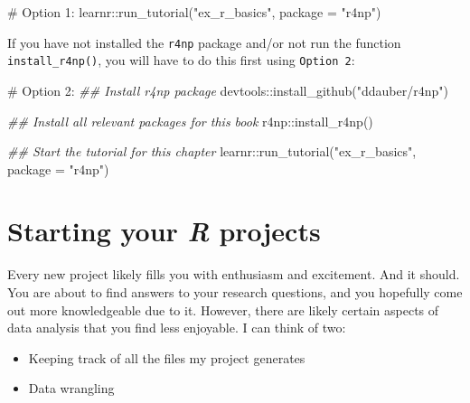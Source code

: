 \documentclass[
  letterpaper,
]{krantz}
\makeatletter
\newenvironment{Shaded}{\begin{snugshade}}{\end{snugshade}}
\newcommand{\AttributeTok}[1]{\textcolor[rgb]{0.40,0.45,0.13}{#1}}
\newcommand{\CommentTok}[1]{\textcolor[rgb]{0.37,0.37,0.37}{#1}}
\newcommand{\DocumentationTok}[1]{\textcolor[rgb]{0.37,0.37,0.37}{\textit{#1}}}
\newcommand{\FunctionTok}[1]{\textcolor[rgb]{0.28,0.35,0.67}{#1}}
\newcommand{\NormalTok}[1]{\textcolor[rgb]{0.00,0.23,0.31}{#1}}
\newcommand{\SpecialCharTok}[1]{\textcolor[rgb]{0.37,0.37,0.37}{#1}}
\newcommand{\StringTok}[1]{\textcolor[rgb]{0.13,0.47,0.30}{#1}}
\newenvironment{kframe}{%
\medskip{}
\setlength{\fboxsep}{.8em}
 \def\at@end@of@kframe{}%
 \ifinner\ifhmode%
  \def\at@end@of@kframe{\end{minipage}}%
  \begin{minipage}{\columnwidth}%
 \fi\fi%
 \def\FrameCommand##1{\hskip\@totalleftmargin \hskip-\fboxsep
 \colorbox{shadecolor}{##1}\hskip-\fboxsep
     \hskip-\linewidth \hskip-\@totalleftmargin \hskip\columnwidth}%
 \MakeFramed {\advance\hsize-\width
   \@totalleftmargin\z@ \linewidth\hsize
   \@setminipage}}%
 {\par\unskip\endMakeFramed%
 \at@end@of@kframe}
\renewenvironment{Shaded}{\begin{kframe}}{\end{kframe}}
\makeatother
\begin{document}
\begin{Shaded}
\begin{Highlighting}[]
\CommentTok{\# Option 1:}
\NormalTok{learnr}\SpecialCharTok{::}\FunctionTok{run\_tutorial}\NormalTok{(}\StringTok{"ex\_r\_basics"}\NormalTok{, }\AttributeTok{package =} \StringTok{"r4np"}\NormalTok{)}
\end{Highlighting}
\end{Shaded}

If you have not installed the \texttt{r4np} package and/or not run the
function \texttt{install\_r4np()}, you will have to do this first using
\texttt{Option\ 2}:

\begin{Shaded}
\begin{Highlighting}[]
\CommentTok{\# Option 2:}
\DocumentationTok{\#\# Install \textquotesingle{}r4np\textquotesingle{} package}
\NormalTok{devtools}\SpecialCharTok{::}\FunctionTok{install\_github}\NormalTok{(}\StringTok{"ddauber/r4np"}\NormalTok{)}

\DocumentationTok{\#\# Install all relevant packages for this book}
\NormalTok{r4np}\SpecialCharTok{::}\FunctionTok{install\_r4np}\NormalTok{()}

\DocumentationTok{\#\# Start the tutorial for this chapter}
\NormalTok{learnr}\SpecialCharTok{::}\FunctionTok{run\_tutorial}\NormalTok{(}\StringTok{"ex\_r\_basics"}\NormalTok{, }\AttributeTok{package =} \StringTok{"r4np"}\NormalTok{)}
\end{Highlighting}
\end{Shaded}


\chapter{\texorpdfstring{Starting your \emph{R}
projects}{Starting your R projects}}\label{sec-starting-your-r-projects}

Every new project likely fills you with enthusiasm and excitement. And
it should. You are about to find answers to your research questions, and
you hopefully come out more knowledgeable due to it. However, there are
likely certain aspects of data analysis that you find less enjoyable. I
can think of two:

\begin{itemize}
\item
  Keeping track of all the files my project generates
\item
  Data wrangling
\end{itemize}
\end{document}
